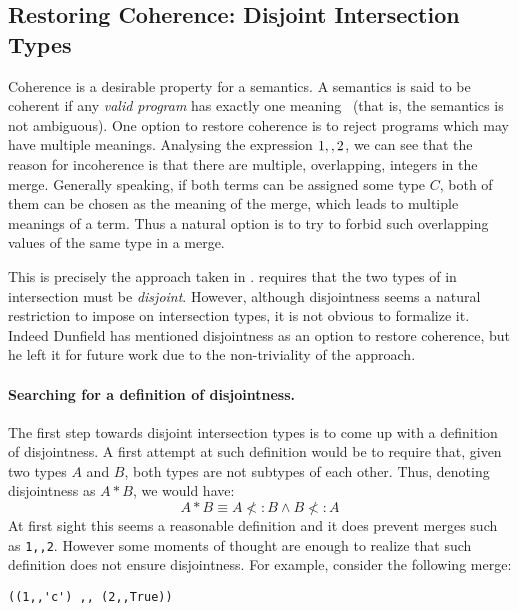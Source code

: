 \subsection{Restoring Coherence: Disjoint Intersection Types}\label{sec:restoring}
Coherence is a desirable property for a semantics. A semantics is said
to be coherent if any \emph{valid program} has exactly one
meaning~\cite{reynolds1991coherence} (that is, the semantics is not ambiguous).
One option to restore coherence is to reject programs which may have
multiple meanings.
Analysing the expression $1 ,, 2$, we can see that the reason
for incoherence is that there are multiple, overlapping, integers in the
merge. Generally speaking, if both terms can be assigned some type $C$,
both of them can be chosen as the meaning of the merge,
which leads to multiple meanings of a term.
Thus a natural option is to try to forbid such overlapping
values of the same type in a merge.

This is precisely the approach taken in \namedis. \namedis requires that the
two types of in intersection must be \emph{disjoint}.  However,
although disjointness seems a natural restriction to impose on
intersection types, it is not obvious to formalize it. Indeed Dunfield
has mentioned disjointness as an option to restore coherence, but he
left it for future work due to the non-triviality of the approach.

\paragraph{Searching for a definition of disjointness.}
The first step towards disjoint intersection types is to come up
with a definition of disjointness. A first attempt at such definition would
be to require that, given two types $A$ and $B$, both types are not
subtypes of each other. Thus, denoting disjointness as $A * B$, we would have:
\[A * B \equiv A \not<: B \wedge B \not<: A\]
At first sight this seems a reasonable definition and it does prevent
merges such as \lstinline{1,,2}. However some moments of thought are enough to realize that
such definition does not ensure disjointness. For example, consider
the following merge:

\begin{lstlisting}
((1,,'c') ,, (2,,True))
\end{lstlisting}

